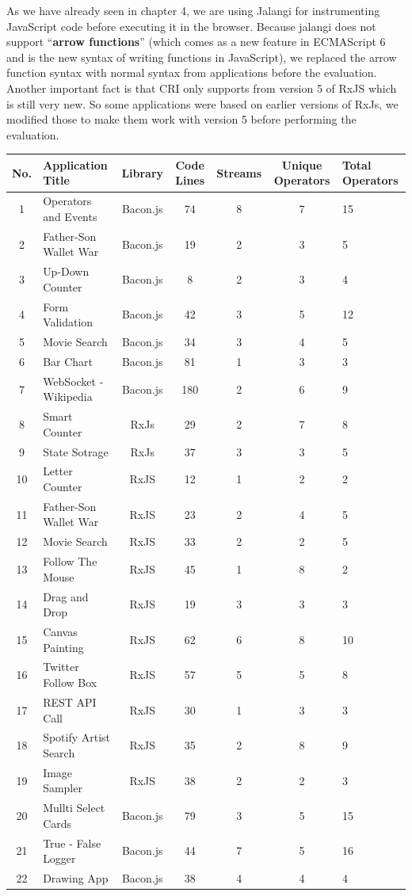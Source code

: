As we have already seen in chapter 4, we are using Jalangi for instrumenting JavaScript code before executing it in the browser. Because jalangi does not support ``\textbf{arrow functions}'' (which comes as a new feature in  ECMAScript 6 and is the new syntax of writing functions in JavaScript), we replaced the arrow function syntax with normal syntax from applications before the evaluation.
Another important fact is that CRI only supports from version 5 of RxJS which is still very new. So some applications were based on earlier versions of RxJs, we modified those to make them work with version 5 before performing the evaluation.

\begin{table}[h!]
\begin{center}
	\begin{tabular}{  |c|m{4cm}|c|c|c|c|m{2cm}|}
		\hline
		No. & Application Title & Library & Code Lines & Streams & Unique Operators & Total Operators  \\ \hline
		1  & Operators and Events & Bacon.js & 74 & 8 & 7 & 15 \\ \hline
		2 & Father-Son Wallet War & Bacon.js & 19 & 2 & 3 & 5 \\ \hline
		3 & Up-Down Counter  & Bacon.js & 8 & 2 & 3 & 4 \\ \hline
		4 & Form Validation & Bacon.js & 42 & 3 & 5 & 12 \\ \hline
		5 & Movie Search & Bacon.js & 34 & 3 & 4 & 5 \\ \hline
		6 & Bar Chart & Bacon.js & 81 & 1 & 3 & 3 \\ \hline
		7 & WebSocket - Wikipedia & Bacon.js & 180 & 2 & 6 & 9 \\ \hline
		8 & Smart Counter & RxJs & 29 & 2 & 7 & 8 \\ \hline
		9 & State Sotrage & RxJs & 37 & 3 & 3 & 5 \\ \hline
		10 & Letter Counter & RxJS & 12 & 1 & 2 & 2 \\ \hline
		11 & Father-Son Wallet War & RxJS & 23 & 2 & 4 & 5 \\ \hline
		12 & Movie Search & RxJS & 33 & 2 & 2 & 5 \\ \hline
		13 & Follow The Mouse & RxJS & 45 & 1 & 8 & 2 \\ \hline
		14 & Drag and Drop  & RxJS & 19 & 3 & 3 & 3 \\ \hline
		15 & Canvas Painting & RxJS & 62 & 6 & 8 & 10 \\ \hline
		16 & Twitter Follow Box & RxJS & 57 & 5 & 5 & 8 \\ \hline
		17 & REST API Call  & RxJS & 30 & 1 & 3 & 3 \\ \hline
		18 & Spotify Artist Search & RxJS & 35 & 2 & 8 & 9 \\ \hline
		19 & Image Sampler & RxJS & 38 & 2 & 2 & 3 \\ \hline
		20 & Mullti Select Cards & Bacon.js & 79 & 3 & 5 & 15 \\ \hline
		21 & True - False Logger & Bacon.js & 44 & 7 & 5 & 16 \\ \hline
		22 & Drawing App & Bacon.js & 38 & 4 & 4 & 4 \\ \hline
		

\end{tabular}
\end{center}
\end{table}
